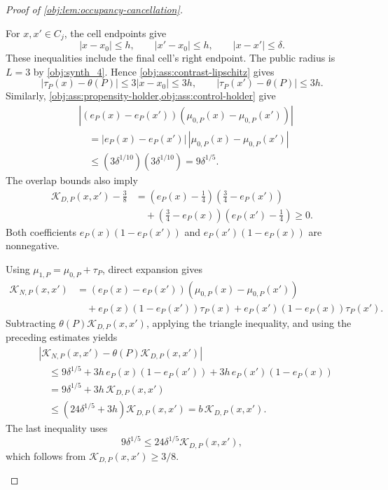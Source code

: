 \begin{proof}[Proof of \cref{obj:lem:occupancy-cancellation}]
\begin{enumerate}
For \(x,x'\in C_j\), the cell endpoints give
\[
|x-x_0|\le h,\qquad
|x'-x_0|\le h,\qquad
|x-x'|\le\delta.
\]
These inequalities include the final cell's right endpoint. The public radius is \(L=3\) by \cref{obj:synth_4}. Hence
\cref{obj:ass:contrast-lipschitz} gives
\[
|\tau_P(x)-\theta(P)|
\le3|x-x_0|\le3h,
\qquad
|\tau_P(x')-\theta(P)|\le3h.
\]
Similarly, \cref{obj:ass:propensity-holder,obj:ass:control-holder} give
\[
\begin{aligned}
&\left|
(e_P(x)-e_P(x'))
(\mu_{0,P}(x)-\mu_{0,P}(x'))
\right|\\
&\quad=
|e_P(x)-e_P(x')|\,
|\mu_{0,P}(x)-\mu_{0,P}(x')|\\
&\quad\le
(3\delta^{1/10})(3\delta^{1/10})
=9\delta^{1/5}.
\end{aligned}
\]
The overlap bounds also imply
\[
\begin{aligned}
\mathcal K_{D,P}(x,x')-\frac38
&=
\left(e_P(x)-\frac14\right)
\left(\frac34-e_P(x')\right)\\
&\quad+
\left(\frac34-e_P(x)\right)
\left(e_P(x')-\frac14\right)
\ge0.
\end{aligned}
\]
Both coefficients \(e_P(x)(1-e_P(x'))\) and
\(e_P(x')(1-e_P(x))\) are nonnegative.

Using \(\mu_{1,P}=\mu_{0,P}+\tau_P\), direct expansion gives
\[
\begin{aligned}
\mathcal K_{N,P}(x,x')
&=
(e_P(x)-e_P(x'))
(\mu_{0,P}(x)-\mu_{0,P}(x'))\\
&\quad+
e_P(x)(1-e_P(x'))\tau_P(x)
+e_P(x')(1-e_P(x))\tau_P(x').
\end{aligned}
\]
Subtracting \(\theta(P)\mathcal K_{D,P}(x,x')\), applying the triangle inequality, and using the preceding estimates yields
\[
\begin{aligned}
&|\mathcal K_{N,P}(x,x')
      -\theta(P)\mathcal K_{D,P}(x,x')|\\
&\quad\le
9\delta^{1/5}
+3h\,e_P(x)(1-e_P(x'))
+3h\,e_P(x')(1-e_P(x))\\
&\quad=
9\delta^{1/5}+3h\,\mathcal K_{D,P}(x,x')\\
&\quad\le
(24\delta^{1/5}+3h)\mathcal K_{D,P}(x,x')
=b\,\mathcal K_{D,P}(x,x').
\end{aligned}
\]
The last inequality uses
\[
9\delta^{1/5}
\le24\delta^{1/5}\mathcal K_{D,P}(x,x'),
\]
which follows from \(\mathcal K_{D,P}(x,x')\ge3/8\).


\end{enumerate}
\end{proof}
